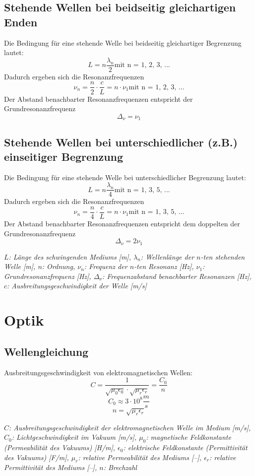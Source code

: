 \documentclass[a4paper,10pt]{article}
\newenvironment{displayformula}
{
	\begin{framed}
		\color{formulaColor}
	}
	{\end{framed}}
\newcommand{\formulalegend}[1]{%
	\par\vspace{0.5ex}%
	{{\color{legendColor}\RaggedRight\small\textit{#1}}}%
	\par\vspace{1.5ex}%
}
\begin{document}
\subsection{Stehende Wellen bei beidseitig gleichartigen Enden}

\begin{displayformula}
	Die Bedingung für eine stehende Welle bei beidseitig gleichartiger Begrenzung lautet:
	\[
	L = n\frac{\lambda_n}{2} \text{mit n = 1, 2, 3, ...}
	\]
	Dadurch ergeben sich die Resonanzfrequenzen
	\[
	\nu_n = \frac{n}{2} \cdot \frac{c}{L} = n \cdot \nu_1 \text{mit n = 1, 2, 3, ...}
	\]
	Der Abstand benachbarter Resonanzfrequenzen entspricht der Grundresonanzfrequenz
	\[
	\Delta_\nu = \nu_1
	\]
\end{displayformula}


\subsection{Stehende Wellen bei unterschiedlicher (z.B.) einseitiger Begrenzung}

\begin{displayformula}
	Die Bedingung für eine stehende Welle bei unterschiedlicher Begrenzung lautet:
	\[
	L = n\frac{\lambda_n}{4} \text{mit n = 1, 3, 5, ...}
	\]
	Dadurch ergeben sich die Resonanzfrequenzen
	\[
	\nu_n = \frac{n}{4} \cdot \frac{c}{L} = n \cdot \nu_1 \text{mit n = 1, 3, 5, ...}
	\]
	Der Abstand benachbarter Resonanzfrequenzen entspricht dem doppelten der Grundresonanzfrequenz
	\[
	\Delta_\nu = 2\nu_1
	\]
\end{displayformula}
\formulalegend{
	\( L \): Länge des schwingenden Mediums [m], 
	\( \lambda_n \): Wellenlänge der \(n\)-ten stehenden Welle [m], 
	\( n \): Ordnung, 
	\( \nu_n \): Frequenz der \(n\)-ten Resonanz [Hz], 
	\( \nu_1 \): Grundresonanzfrequenz [Hz], 
	\( \Delta_\nu \): Frequenzabstand benachbarter Resonanzen [Hz], 
	\( c \): Ausbreitungsgeschwindigkeit der Welle [m/s]
}


\section{Optik}

\subsection{Wellengleichung}

\begin{displayformula}
	Ausbreitungsgeschwindigkeit von elektromagnetischen Wellen:
	\[
	C = \frac{1}{\sqrt{\mu_0 \epsilon_0} \cdot \sqrt{\mu_r \epsilon_r}} = \frac{C_0}{n}
	\]
	\[
	C_0 \approx 3 \cdot 10^8 \frac{m}{s}
	\]
	\[
	n = \sqrt{\mu_r \epsilon_r}
	\]
\end{displayformula}
\formulalegend{
	\( C \): Ausbreitungsgeschwindigkeit der elektromagnetischen Welle im Medium [m/s], 
	\( C_0 \): Lichtgeschwindigkeit im Vakuum [m/s], 
	\( \mu_0 \): magnetische Feldkonstante (Permeabilität des Vakuums) [H/m], 
	\( \epsilon_0 \): elektrische Feldkonstante (Permittivität des Vakuums) [F/m], 
	\( \mu_r \): relative Permeabilität des Mediums [–], 
	\( \epsilon_r \): relative Permittivität des Mediums [–], 
	\( n \): Brechzahl
}
\end{document}
